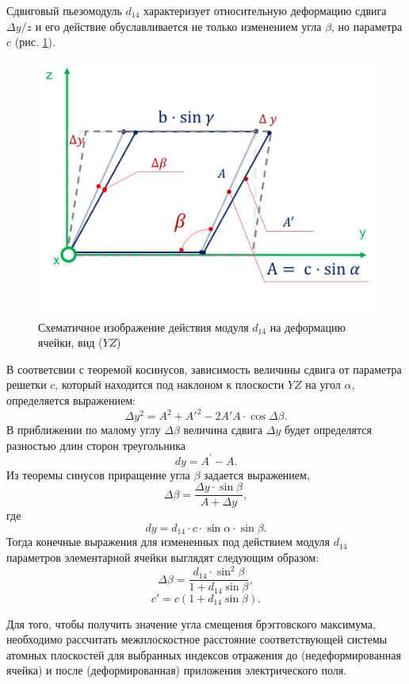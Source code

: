 Сдвиговый пьезомодуль $d_{14}$ характеризует относительную деформацию сдвига $\Delta y/z$ и
его действие обуславливается не только
изменением угла $\beta$, но параметра $c$ (рис. \ref{ris:d14}).
\begin{figure}[H]
  \centering
  \includegraphics[width=.6\textwidth]{images/d14.png}
  \caption{Схематичное изображение действия модуля $d_{14}$ на деформацию ячейки, вид ($YZ$)}
  \label{ris:d14}
\end{figure}
В соответсвии с теоремой косинусов, зависимость величины сдвига от параметра решетки $c$,
который находится под наклоном к плоскости $YZ$ на угол $\alpha$, определяется выражением:
$$
    \Delta y^2 = A^2 + A{'}^2 - 2 A{'}A \cdot \cos \Delta \beta.
$$
В приближении по малому углу $\Delta \beta$ величина сдвига $\Delta y$ будет
определятся разностью длин сторон треугольника
$$
  dy = A^{'} - A.
$$
Из теоремы синусов приращение угла $\beta$ задается выражением,
$$
\Delta \beta = \frac{\Delta y \cdot\sin \beta}{ A+ \Delta y },
$$
\noindent
где
$$
dy = d_{14} \cdot c \cdot \sin \alpha \cdot \sin \beta.
$$
Тогда конечные выражения для измененных под действием модуля $d_{14}$ параметров элементарной ячейки
выглядят следующим образом:
\begin{equation}
   \Delta \beta = \frac{d_{14} \cdot \sin^2\beta}{1+d_{14}\sin \beta},
   \label{eq:b_formed_5}
\end{equation}
\begin{equation}
   c{'} = c(1+d_{14}\sin\beta).
   \label{eq:b_formed_6}
\end{equation}

Для того, чтобы получить значение угла смещения брэгговского максимума,
необходимо рассчитать межплоскостное расстояние соответствующей системы атомных плоскостей
 для выбранных индексов отражения
до (недеформированная ячейка) и после (деформированная) приложения электрического
поля.
